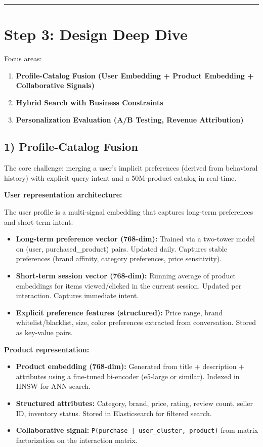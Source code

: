 \bigskip\hrule\bigskip

\section*{Step 3: Design Deep Dive}

Focus areas:

\begin{enumerate}
  \item \textbf{Profile-Catalog Fusion (User Embedding + Product Embedding + Collaborative Signals)}
  \item \textbf{Hybrid Search with Business Constraints}
  \item \textbf{Personalization Evaluation (A/B Testing, Revenue Attribution)}
\end{enumerate}

\subsection*{1) Profile-Catalog Fusion}

The core challenge: merging a user's implicit preferences (derived from behavioral history) with explicit query intent and a 50M-product catalog in real-time.

\textbf{User representation architecture:}

The user profile is a multi-signal embedding that captures long-term preferences and short-term intent:

\begin{itemize}
  \item \textbf{Long-term preference vector (768-dim):} Trained via a two-tower model on (user, purchased\_product) pairs. Updated daily. Captures stable preferences (brand affinity, category preferences, price sensitivity).
  \item \textbf{Short-term session vector (768-dim):} Running average of product embeddings for items viewed/clicked in the current session. Updated per interaction. Captures immediate intent.
  \item \textbf{Explicit preference features (structured):} Price range, brand whitelist/blacklist, size, color preferences extracted from conversation. Stored as key-value pairs.
\end{itemize}

\textbf{Product representation:}

\begin{itemize}
  \item \textbf{Product embedding (768-dim):} Generated from title + description + attributes using a fine-tuned bi-encoder (e5-large or similar). Indexed in HNSW for ANN search.
  \item \textbf{Structured attributes:} Category, brand, price, rating, review count, seller ID, inventory status. Stored in Elasticsearch for filtered search.
  \item \textbf{Collaborative signal:} \texttt{P(purchase | user\_cluster, product)} from matrix factorization on the interaction matrix.
\end{itemize}

